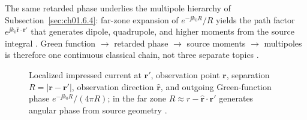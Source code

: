 The same retarded phase underlies the multipole hierarchy of Subsection~\ref{sec:ch01.6.4}: far-zone expansion of $e^{-\jj k_0 R}/R$ yields the path factor $e^{\jj k_0\hat{\mathbf{r}}\cdot\mathbf{r}'}$ that generates dipole, quadrupole, and higher moments from the source integral \cite{jackson1999,stratton1941}. Green function $\rightarrow$ retarded phase $\rightarrow$ source moments $\rightarrow$ multipoles is therefore one continuous classical chain, not three separate topics \cite{stratton1941}.

\begin{figure}[t]
\centering
\VolIPhysFig{\VolIPhysGreenFunctionGeometry}
\caption{Localized impressed current at $\mathbf{r}'$, observation point $\mathbf{r}$, separation $R=|\mathbf{r}-\mathbf{r}'|$, observation direction $\hat{\mathbf{r}}$, and outgoing Green-function phase $e^{-\jj k_0 R}/(4\pi R)$; in the far zone $R\approx r-\hat{\mathbf{r}}\cdot\mathbf{r}'$ generates angular phase from source geometry \cite{stratton1941,jackson1999,tai1994}.}
\label{fig:ch1.green-function-seed}
\end{figure}
